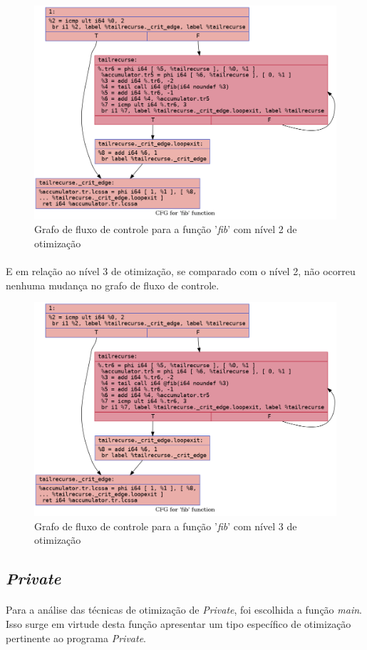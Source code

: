 \documentclass[12pt]{article}
\begin{document}
\begin{figure}
    \centering
    \includegraphics[width=0.5\linewidth]{fib2_.fib_O2.png}
    \caption{Grafo de fluxo de controle para a função '\textit{fib}' com nível 2 de otimização}
\end{figure}

\paragraph{}E em relação ao nível 3 de otimização, se comparado com o nível 2, não ocorreu nenhuma mudança no grafo de fluxo de controle.

\begin{figure}
    \centering
    \includegraphics[width=0.5\linewidth]{fib2_.fib_O3.png}
    \caption{Grafo de fluxo de controle para a função '\textit{fib}' com nível 3 de otimização}
\end{figure}

\FloatBarrier

\subsection{\textit{Private}}

\paragraph{}Para a análise das técnicas de otimização de \textit{Private}, foi escolhida a função \textit{main}. Isso surge em virtude desta função apresentar um tipo específico de otimização pertinente ao programa \textit{Private}.
\end{document}
